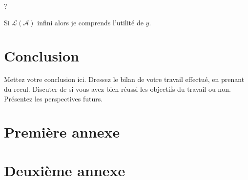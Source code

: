\documentclass[12pt,a4paper,oneside,titlepage]{report}
\begin{document}
\noindent ?

Si $\mathcal{L}(\mathcal{A})$ infini alors je comprends l'utilité de $y$.





\chapter*{Conclusion}
\renewcommand{\leftmark}{CONCLUSION}

Mettez votre conclusion ici.  Dressez le bilan de votre travail effectué, en prenant du recul. Discuter de si vous avez bien réussi les objectifs du travail ou non. Présentez les perspectives futurs.

\newpage




\newpage
\appendix
{}

\chapter{Premi\`ere annexe}
\renewcommand{\leftmark}{ANNEXE \thechapter.~~Premi\`ere annexe}
\label{annexe1}

\chapter{Deuxi\`eme annexe}
\renewcommand{\leftmark}{ANNEXE \thechapter.~~Deuxi\`eme annexe}
\label{annexe2}

\end{document}
